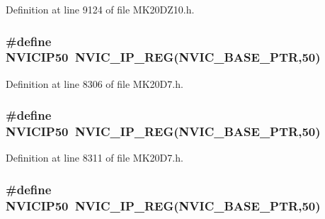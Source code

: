 Definition at line 9124 of file M\+K20\+D\+Z10.\+h.

\subsubsection[{\texorpdfstring{N\+V\+I\+C\+I\+P50}{NVICIP50}}]{\setlength{\rightskip}{0pt plus 5cm}\#define N\+V\+I\+C\+I\+P50~{\bf N\+V\+I\+C\+\_\+\+I\+P\+\_\+\+R\+EG}({\bf N\+V\+I\+C\+\_\+\+B\+A\+S\+E\+\_\+\+P\+TR},50)}\hypertarget{group___n_v_i_c___register___accessor___macros_ga8e65ddf4d4e3be7fadd089550928d9eb}{}\label{group___n_v_i_c___register___accessor___macros_ga8e65ddf4d4e3be7fadd089550928d9eb}


Definition at line 8306 of file M\+K20\+D7.\+h.

\subsubsection[{\texorpdfstring{N\+V\+I\+C\+I\+P50}{NVICIP50}}]{\setlength{\rightskip}{0pt plus 5cm}\#define N\+V\+I\+C\+I\+P50~{\bf N\+V\+I\+C\+\_\+\+I\+P\+\_\+\+R\+EG}({\bf N\+V\+I\+C\+\_\+\+B\+A\+S\+E\+\_\+\+P\+TR},50)}\hypertarget{group___n_v_i_c___register___accessor___macros_ga8e65ddf4d4e3be7fadd089550928d9eb}{}\label{group___n_v_i_c___register___accessor___macros_ga8e65ddf4d4e3be7fadd089550928d9eb}


Definition at line 8311 of file M\+K20\+D7.\+h.

\subsubsection[{\texorpdfstring{N\+V\+I\+C\+I\+P50}{NVICIP50}}]{\setlength{\rightskip}{0pt plus 5cm}\#define N\+V\+I\+C\+I\+P50~{\bf N\+V\+I\+C\+\_\+\+I\+P\+\_\+\+R\+EG}({\bf N\+V\+I\+C\+\_\+\+B\+A\+S\+E\+\_\+\+P\+TR},50)}\hypertarget{group___n_v_i_c___register___accessor___macros_ga8e65ddf4d4e3be7fadd089550928d9eb}{}\label{group___n_v_i_c___register___accessor___macros_ga8e65ddf4d4e3be7fadd089550928d9eb}


